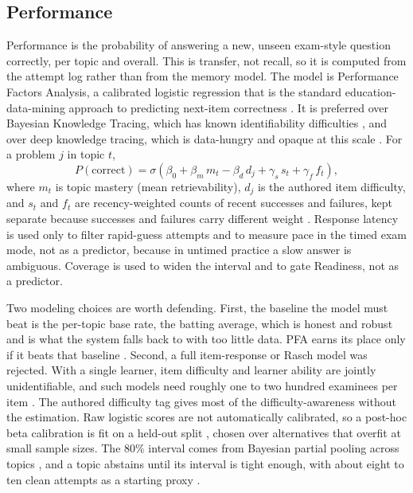 \documentclass[11pt]{article}
\begin{document}
\subsection{Performance}

Performance is the probability of answering a new, unseen exam-style question
correctly, per topic and overall. This is transfer, not recall, so it is computed
from the attempt log rather than from the memory model. The model is Performance
Factors Analysis, a calibrated logistic regression that is the standard
education-data-mining approach to predicting next-item correctness
\citep{pavlik2009, cen2006}. It is preferred over Bayesian Knowledge Tracing,
which has known identifiability difficulties \citep{corbett1994}, and over deep
knowledge tracing, which is data-hungry and opaque at this scale \citep{piech2015}.
For a problem $j$ in topic $t$,
\[
P(\text{correct}) = \sigma\!\left(\beta_0 + \beta_m\, m_t - \beta_d\, d_j
+ \gamma_s\, s_t + \gamma_f\, f_t\right),
\]
where $m_t$ is topic mastery (mean retrievability), $d_j$ is the authored item
difficulty, and $s_t$ and $f_t$ are recency-weighted counts of recent successes and
failures, kept separate because successes and failures carry different weight
\citep{galyardt2014}. Response latency is used only to filter rapid-guess attempts
and to measure pace in the timed exam mode, not as a predictor, because in untimed
practice a slow answer is ambiguous. Coverage is used to widen the interval and to
gate Readiness, not as a predictor.

Two modeling choices are worth defending. First, the baseline the model must beat is
the per-topic base rate, the batting average, which is honest and robust and is what
the system falls back to with too little data. PFA earns its place only if it beats
that baseline \citep{gong2011}. Second, a full item-response or Rasch model was
rejected. With a single learner, item difficulty and learner ability are jointly
unidentifiable, and such models need roughly one to two hundred examinees per item
\citep{lord1980, embretson2000}. The authored difficulty tag gives most of the
difficulty-awareness without the estimation. Raw logistic scores are not
automatically calibrated, so a post-hoc beta calibration is fit on a held-out split
\citep{kull2017, platt1999}, chosen over alternatives that overfit at small sample
sizes. The 80\% interval comes from Bayesian partial pooling across topics
\citep{gelman2013}, and a topic abstains until its interval is tight enough, with about eight to ten clean
attempts as a starting proxy \citep{brown2001, peduzzi1996}.
\end{document}
